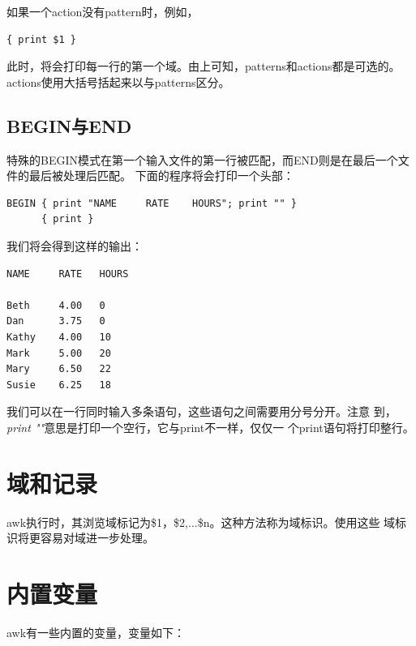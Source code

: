 如果一个action没有pattern时，例如，

\begin{verbatim}
{ print $1 }
\end{verbatim}

此时，将会打印每一行的第一个域。由上可知，patterns和actions都是可选的。
actions使用大括号括起来以与patterns区分。

\subsection{BEGIN与END}

特殊的BEGIN模式在第一个输入文件的第一行被匹配，而END则是在最后一个文件的最后被处理后匹配。
下面的程序将会打印一个头部：

\begin{verbatim}
BEGIN { print "NAME     RATE    HOURS"; print "" }
      { print }
\end{verbatim}

我们将会得到这样的输出：

\begin{verbatim}
NAME     RATE   HOURS

Beth     4.00   0
Dan      3.75   0
Kathy    4.00   10
Mark     5.00   20
Mary     6.50   22
Susie    6.25   18
\end{verbatim}

我们可以在一行同时输入多条语句，这些语句之间需要用分号分开。注意
到，\textit{print ""}意思是打印一个空行，它与print不一样，仅仅一
个print语句将打印整行。

\section{域和记录}
\label{sec:FieldRecordAwk}

awk执行时，其浏览域标记为\$1，\$2,...\$n。这种方法称为域标识。使用这些
域标识将更容易对域进一步处理。

\section{内置变量}

awk有一些内置的变量，变量如下：

